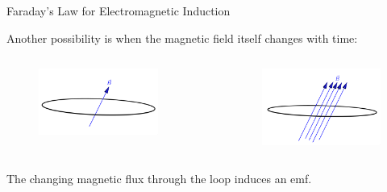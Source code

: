 \documentclass{beamer}
\begin{document}
\begin{frame}{Faraday's Law for Electromagnetic Induction}

Another possibility is when the magnetic field itself changes with time:

\begin{columns}

\begin{column}{0.5\textwidth}
\begin{figure}[H]
\centering
\includegraphics[width=\textwidth]{figures/increasing_bfield_init.png}
\end{figure}
\end{column}
~
\begin{column}{0.5\textwidth}
\hspace{4em}
\begin{figure}[H]
\centering
\includegraphics[width=\textwidth]{figures/increasing_bfield_fin.png}
\end{figure}
\end{column}

\end{columns}

\vfill

The changing magnetic flux through the loop induces an emf.

\end{frame}
\end{document}
